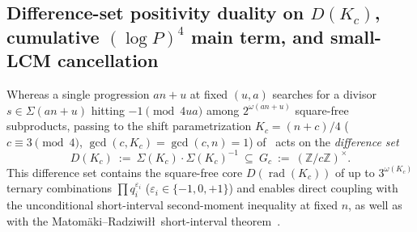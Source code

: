 \documentclass[11pt, a4paper]{article}
\theoremstyle{plain}
\theoremstyle{definition}
\newcommand{\Z}{\mathbb{Z}}
\begin{document}
\subsection{Difference-set positivity duality on $D(K_c)$, cumulative $(\log P)^{4}$ main term, and small-LCM cancellation}\label{subsec:difference_set_MR}

Whereas a single progression $an+u$ at fixed $(u,a)$ searches for a divisor $s\in\Sigma(an+u)$ hitting $-1\pmod{4ua}$ among $2^{\omega(an+u)}$ square-free subproducts, passing to the shift parametrization $K_c=(n+c)/4$ ($c\equiv3\pmod 4$, $\gcd(c,K_c)=\gcd(c,n)=1$) of~\cite[Prop.~2.4]{dahan2026a} acts on the \emph{difference set}
\[
D(K_c)\ :=\ \Sigma(K_c)\cdot\Sigma(K_c)^{-1}\ \subseteq\ G_c\ :=\ (\Z/c\Z)^{\times}.
\]
This difference set contains the square-free core $D(\operatorname{rad}(K_c))$ of up to $3^{\omega(K_c)}$ ternary combinations $\prod q_i^{\varepsilon_i}$ ($\varepsilon_i\in\{-1,0,+1\}$) and enables direct coupling with the unconditional short-interval second-moment inequality at fixed $n$, as well as with the Matom\"{a}ki--Radziwi\l\l\ short-interval theorem~\cite{matomaki_radziwill2016}.
\end{document}

